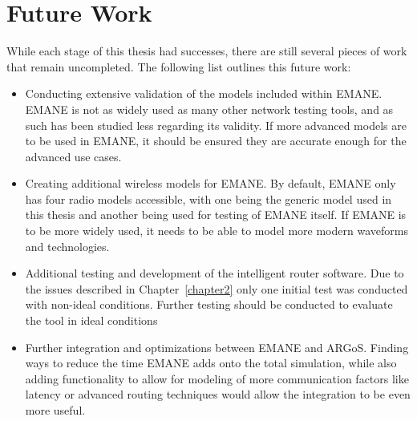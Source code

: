 \section{Future Work}
While each stage of this thesis had successes, there are still several pieces of work that remain uncompleted. The following list outlines this future work:
\begin{itemize}
    \item Conducting extensive validation of the models included within EMANE. EMANE is not as widely used as many other network testing tools, and as such has been studied less regarding its validity. If more advanced models are to be used in EMANE, it should be ensured they are accurate enough for the advanced use cases.
    \item Creating additional wireless models for EMANE. By default, EMANE only has four radio models accessible, with one being the generic model used in this thesis and another being used for testing of EMANE itself. If EMANE is to be more widely used, it needs to be able to model more modern waveforms and technologies.
    \item Additional testing and development of the intelligent router software. Due to the issues described in Chapter~\ref{chapter2} only one initial test was conducted with non-ideal conditions. Further testing should be conducted to evaluate the tool in ideal conditions
    \item Further integration and optimizations between EMANE and ARGoS. Finding ways to reduce the time EMANE adds onto the total simulation, while also adding functionality to allow for modeling of more communication factors like latency or advanced routing techniques would allow the integration to be even more useful.
\end{itemize}